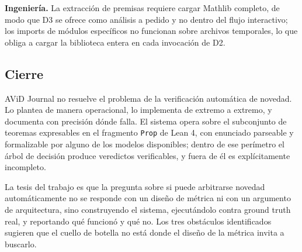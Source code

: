 \documentclass[12pt,a4paper]{article}
\theoremstyle{remark}
\begin{document}
\textbf{Ingeniería.} La extracción de premisas requiere cargar Mathlib completo, de modo que D3 se ofrece como análisis a pedido y no dentro del flujo interactivo; los imports de módulos específicos no funcionan sobre archivos temporales, lo que obliga a cargar la biblioteca entera en cada invocación de D2.

\subsection{Cierre}

AViD Journal no resuelve el problema de la verificación automática de novedad. Lo plantea de manera operacional, lo implementa de extremo a extremo, y documenta con precisión dónde falla. El sistema opera sobre el subconjunto de teoremas expresables en el fragmento \texttt{Prop} de Lean 4, con enunciado parseable y formalizable por alguno de los modelos disponibles; dentro de ese perímetro el árbol de decisión produce veredictos verificables, y fuera de él es explícitamente incompleto.

La tesis del trabajo es que la pregunta sobre si puede arbitrarse novedad automáticamente no se responde con un diseño de métrica ni con un argumento de arquitectura, sino construyendo el sistema, ejecutándolo contra ground truth real, y reportando qué funcionó y qué no. Los tres obstáculos identificados sugieren que el cuello de botella no está donde el diseño de la métrica invita a buscarlo.
\end{document}
